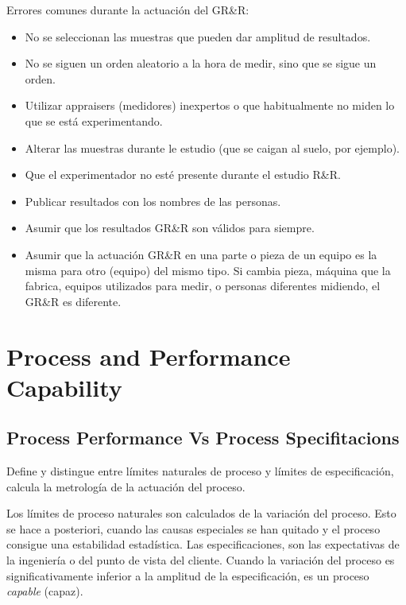 \documentclass[]{article}
\begin{document}
Errores comunes durante la actuación del GR\&R:
\begin{itemize}
	\item No se seleccionan las muestras que pueden dar amplitud de resultados.
	\item No se siguen un orden aleatorio a la hora de medir, sino que se sigue un orden.
	\item Utilizar appraisers (medidores) inexpertos o que habitualmente no miden lo que se está experimentando.
	\item Alterar las muestras durante le estudio (que se caigan al suelo, por ejemplo).
	\item Que el experimentador no esté presente durante el estudio R\&R.
	\item Publicar resultados con los nombres de las personas.
	\item Asumir que los resultados GR\&R son válidos para siempre.
	\item Asumir que la actuación GR\&R en una parte o pieza de un equipo es la misma para otro (equipo) del mismo tipo. Si cambia pieza, máquina que la fabrica, equipos utilizados para medir, o personas diferentes midiendo, el GR\&R es diferente.
\end{itemize}


\pagebreak
\section{Process and Performance Capability}

\subsection{Process Performance Vs Process Specifitacions}

Define y distingue entre límites naturales de proceso y límites de especificación, calcula la metrología de la actuación del proceso.

Los límites de proceso naturales son calculados de la variación del proceso. Esto se hace a posteriori, cuando las causas especiales se han quitado y el proceso consigue una estabilidad estadística. Las especificaciones, son las expectativas de la ingeniería o del punto de vista del cliente. Cuando la variación del proceso es significativamente inferior a la amplitud de la especificación, es un proceso \textit{capable} (capaz).
\end{document}
